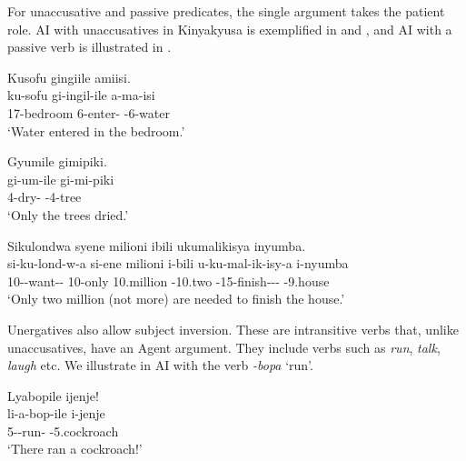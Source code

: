 \documentclass[output=paper]{langscibook}
\begin{document}
\z


For unaccusative and passive predicates, the single argument takes the patient role. AI with unaccusatives in Kinyakyusa is exemplified in  and , and AI with a passive verb is illustrated in .

\ea
\label{bkm:Ref122598932}
Kusofu gingiile amiisi.\\
\gll
ku-sofu  gi-ingil-ile  a-ma-isi\\
17-bedroom  6\SM{}-enter-\PFV{}  \AUG{}-6-water\\
\glt
‘Water entered in the bedroom.’ \citep[158]{MsovelaEtAl2023}\\

\z


\ea
\label{bkm:Ref122598938}
Gyumile gimipiki.\\
\gll
gi-um-ile  gi-mi-piki\\
4\SM{}-dry-\PFV{}  \EXH{}-4-tree\\
\glt
‘Only the trees dried.’\\

\z


\ea
\label{bkm:Ref122598944}
Sikulondwa syene milioni ibili ukumalikisya inyumba.\\
\gll
si-ku-lond-w-a  si-ene  milioni  i-bili  u-ku-mal-ik-isy-a     i-nyumba \\
10\SM-\PRS{}-want-\PASS-\FV{}  10-only  10.million  \AUG{}-10.two  \AUG{}-15-finish-\STAT{}-\CAUS-\FV{} \AUG{}-9.house \\
\glt
‘Only two million (not more) are needed to finish the house.’ \citep[166]{MsovelaEtAl2023}\\

\z

Unergatives also allow subject inversion. These are intransitive verbs that, unlike unaccusatives, have an Agent argument. They include verbs such as \textit{run}, \textit{talk}, \textit{laugh} etc. We illustrate in  AI with the verb \textit{-bopa} ‘run’.

\ea
\label{bkm:Ref135207788}
Lyabopile ijenje!\\
\gll
li-a-bop-ile  i-jenje\\
5\SM{}-\PST{}-run-\PFV{}  \AUG{}-5.cockroach\\
\glt
‘There ran a cockroach!’ \citep[167]{MsovelaEtAl2023}\\
\end{document}
